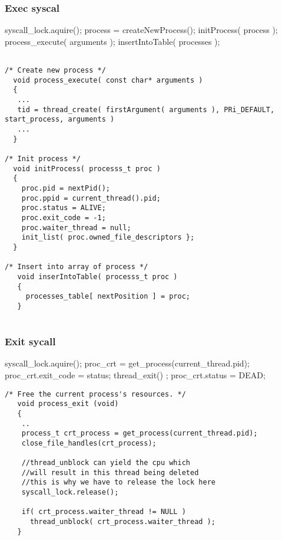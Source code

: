     \subsubsection{Exec syscal}
    \vspace{-3em}
    \begin{program}
      syscall\_lock.aquire();
      process = createNewProcess();
      initProcess( process );
      process\_execute( arguments );
      insertIntoTable( processes );
    \end{program}

    \begin{lstlisting}
    
/* Create new process */
  void process_execute( const char* arguments )
  {
   ...
   tid = thread_create( firstArgument( arguments ), PRi_DEFAULT, start_process, arguments )
   ...
  }

/* Init process */
  void initProcess( processs_t proc )
  {
    proc.pid = nextPid();
    proc.ppid = current_thread().pid;
    proc.status = ALIVE;
    proc.exit_code = -1;
    proc.waiter_thread = null;
    init_list( proc.owned_file_descriptors };
  }

/* Insert into array of process */
   void inserIntoTable( processs_t proc )
   {
     processes_table[ nextPosition ] = proc;
   }
    
    \end{lstlisting}

    \subsubsection{Exit sycall}
    \vspace{-3em} %
      \begin{program}
	syscall\_lock.aquire();
	proc\_crt = get\_process(current\_thread.pid);
	proc\_crt.exit\_code = status;
	thread\_exit() ;
	proc\_crt.status = DEAD;
      \end{program}
    \begin{lstlisting}
/* Free the current process's resources. */	
   void process_exit (void)
   {
    ..
    process_t crt_process = get_process(current_thread.pid);
    close_file_handles(crt_process);
    
    //thread_unblock can yield the cpu which
    //will result in this thread being deleted
    //this is why we have to release the lock here
    syscall_lock.release();
    
    if( crt_process.waiter_thread != NULL ) 
      thread_unblock( crt_process.waiter_thread );
   }
    \end{lstlisting}


